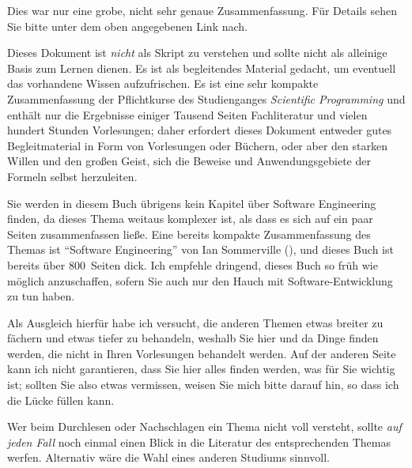 \documentclass[english,ngerman,fontsize=9pt,intoc,index=totoc,refpage,listof=totoc,draft]{scrbook}
\numberwithin{equation}{section}
\let\myTOC\tableofcontents
\renewcommand\tableofcontents{%
  \frontmatter
  \pdfbookmark[1]{\contentsname}{}
  \myTOC
  \mainmatter }
\begin{document}
Dies war nur eine grobe, nicht sehr genaue Zusammenfassung. Für Details
sehen Sie bitte unter dem oben angegebenen Link nach.

\clearpage\frontmatter
\tableofcontents{}
\mainmatter


Dieses Dokument ist \emph{nicht} als Skript zu verstehen und sollte nicht als alleinige Basis zum Lernen dienen.
Es ist als begleitendes Material gedacht, um eventuell das vorhandene Wiss\-en aufzufrischen.
Es ist eine sehr kompakte Zusammenfass\-ung der Pflichtkurse des Studienganges \emph{Scientific Programm\-ing} und enthält nur die Ergebnisse einiger Tausend Seiten Fachliteratur und vielen hundert Stunden Vorlesungen; daher erfordert dieses Dokument entweder gutes Begleitmaterial in Form von Vorlesungen oder Büchern, oder aber
den starken Willen und den großen Geist, sich die Beweise und Anwendungsgebiete der Formeln selbst herzuleiten.

Sie werden in diesem Buch übrigens kein Kapitel über Software Engineering finden, da dieses Thema weitaus komplexer ist, als dass es sich auf ein paar Seiten zusammenfassen ließe.
Eine bereits kompakte Zusammenfassung des Themas ist \enquote{Software Engineering} von Ian Sommerville (\cite{Sommerville}), und dieses Buch ist bereits über 800~Seiten dick.
Ich empfehle dringend, dieses Buch so früh wie möglich anzuschaffen, sofern Sie auch nur den Hauch mit Software-Entwicklung zu tun haben.

Als Ausgleich hierfür habe ich versucht, die anderen Themen etwas breiter zu fächern und etwas tiefer zu behandeln, weshalb Sie hier und da Dinge finden werden, die nicht in Ihren Vorlesungen behandelt werden.
Auf der anderen Seite kann ich nicht garantieren, dass Sie hier alles finden werden, was für Sie wichtig ist; sollten Sie also etwas vermissen, weisen Sie mich bitte darauf hin, so dass ich die Lücke füllen kann.

Wer beim Durchlesen oder Nachschlagen ein Thema nicht voll versteht, sollte \emph{auf jeden Fall} noch einmal einen Blick in die Literatur des entsprechenden Themas werfen.
Alternativ wäre die Wahl eines anderen Studiums sinnvoll.
\end{document}
